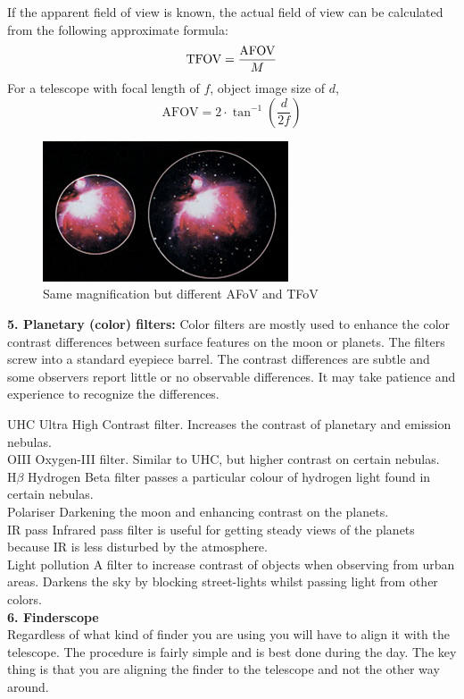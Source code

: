 \documentclass[a4paper,12pt]{extarticle}
\begin{document}
If the apparent field of view is known, the actual field of view can be calculated from the following approximate formula:
\[\text{TFOV}=\frac{\rm AFOV}{M}\]
For a telescope with focal length of $f$, object image size of $d$,
\[\text{AFOV}=2\cdot \tan^{-1}\left(\frac{d}{2f}\right)\]

\begin{figure}[H]
	\centering
	\includegraphics[width=0.4\linewidth]{FOV.png}
	\caption{Same magnification but different AFoV and TFoV}
\end{figure}

\textbf{5. Planetary (color) filters:} Color filters are mostly used to enhance the color contrast differences between surface features on the moon or planets. The filters screw into a standard eyepiece barrel. The contrast differences are subtle and some observers report little or no observable differences. It may take patience and experience to recognize the differences.

{\color{blue} UHC} \quad Ultra High Contrast filter. Increases the contrast of planetary and emission nebulas.\\
{\color{blue} OIII} \quad Oxygen-III filter. Similar to UHC, but higher contrast on certain nebulas.\\
{\color{blue} H$\beta$} \quad Hydrogen Beta filter passes a particular colour of hydrogen light found in certain nebulas.\\
{\color{blue} Polariser} \quad Darkening the moon and enhancing contrast on the planets.\\
{\color{blue} IR pass} \quad Infrared pass filter is useful for getting steady views of the planets because IR is less disturbed by the atmosphere.\\
{\color{blue} Light pollution} \quad A filter to increase contrast of objects when observing from
urban areas. Darkens the sky by blocking street-lights whilst passing light from other colors.\\

\textbf{6. Finderscope}\\

Regardless of what kind of finder you are using you will have to align it with the telescope. The procedure is fairly simple and is best done during the day. The key thing is that you are aligning the finder to the telescope and not the other way around.\\
\end{document}
